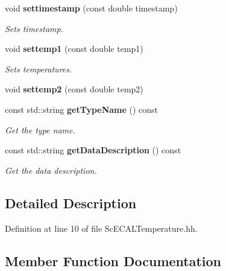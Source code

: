 \begin{DoxyCompactItemize}
\item 
void {\bf settimestamp} (const double timestamp)\label{classCALICE_1_1ScECALTemperature_a4e137896866cc87c77827488a656609a}

\begin{DoxyCompactList}\small\item\em Sets timestamp. \item\end{DoxyCompactList}\item 
void {\bf settemp1} (const double temp1)\label{classCALICE_1_1ScECALTemperature_ac4419e9fc44285ee4d8a3ef12ca5d175}

\begin{DoxyCompactList}\small\item\em Sets temperatures. \item\end{DoxyCompactList}\item 
void {\bfseries settemp2} (const double temp2)\label{classCALICE_1_1ScECALTemperature_ae52839ee37ef6cb2961e35207e5f39e5}

\item 
const std::string {\bf getTypeName} () const 
\begin{DoxyCompactList}\small\item\em Get the type name. \item\end{DoxyCompactList}\item 
const std::string {\bf getDataDescription} () const 
\begin{DoxyCompactList}\small\item\em Get the data description. \item\end{DoxyCompactList}\end{DoxyCompactItemize}


\subsection{Detailed Description}


Definition at line 10 of file ScECALTemperature.hh.

\subsection{Member Function Documentation}
